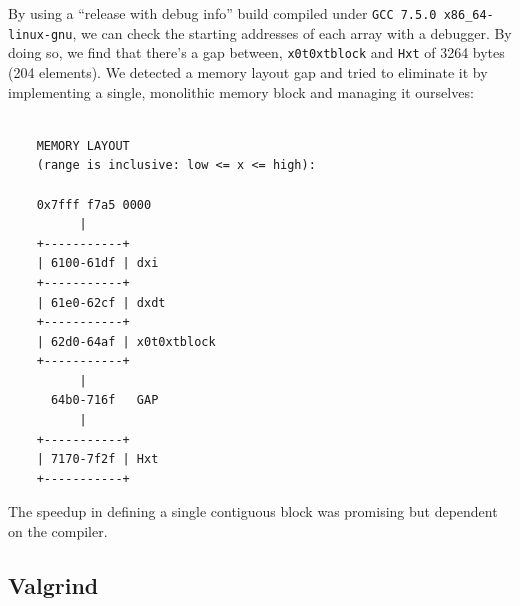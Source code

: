 By using a ``release with debug info'' build compiled under
\verb|GCC 7.5.0 x86_64-linux-gnu|, we can check the starting addresses of
each array with a debugger. By doing so, we find that there's a gap between,
\verb|x0t0xtblock| and \verb|Hxt| of 3264 bytes (204 elements).
We detected a memory layout gap and tried to eliminate it by implementing a
single, monolithic memory block and managing it ourselves:
\footnotesize\begin{verbatim}

    MEMORY LAYOUT
    (range is inclusive: low <= x <= high):

    0x7fff f7a5 0000
          |
    +-----------+
    | 6100-61df | dxi
    +-----------+
    | 61e0-62cf | dxdt
    +-----------+
    | 62d0-64af | x0t0xtblock
    +-----------+
          |
      64b0-716f   GAP
          |
    +-----------+
    | 7170-7f2f | Hxt
    +-----------+
\end{verbatim}
\normalsize
The speedup in defining a single contiguous block was promising but dependent on the compiler.

\subsection{Valgrind}

